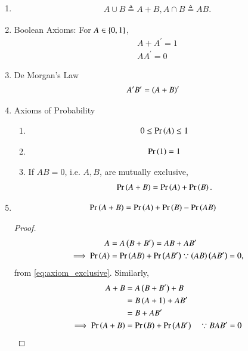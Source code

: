 \begin{enumerate}[label=\thesubsection.\arabic*,ref=\thesubsection.\theenumi]
	\item
\begin{align}
	A \cup B \triangleq A+B, A \cap B \triangleq AB.
\end{align}
	\item  Boolean Axioms:  For $A \in \left\{0,1\right\}$,
\begin{align}
	A + A^{\prime} = 1
	\\
	A  A^{\prime} = 0
\end{align}
\item De Morgan's Law
\begin{align}
A^{\prime}B^{\prime} &=  \brak{A+B}^{\prime}
	\label{eq:demorgan}
\end{align}
\item Axioms of Probability
	\begin{enumerate}
\item 
\begin{align}
	0 \le \pr{A} \le 1	
	\label{eq:axiom-pos}
\end{align}
\item 
\begin{align}
	\pr{1} =1	
	\label{eq:axiom-one}
\end{align}
\item If $AB = 0$, i.e. $A, B$, are mutually exclusive,
\begin{align}
	\pr{A+B} = \pr{A} + \pr{B}.
\label{eq:axiom_exclusive}
\end{align}
	\end{enumerate}
\item 
	\begin{align}
\pr{A+B} &= \pr{A} + \pr{B} - \pr{AB} 
\label{eq:axiom_sum_AB}
\end{align}
		\begin{proof}
\begin{align}
	A &= A \brak{B+B^{\prime}} =  AB + AB^{\prime}
\\
	\implies \pr{A} &=  \pr{AB} + \pr{AB^{\prime}}
	\because
	\brak{ AB}\brak{  AB^{\prime}} = 0,
\label{eq:axiom_sum_A}
\end{align}
from \eqref{eq:axiom_exclusive}.
Similarly,
\begin{align}
A+B &= A\brak{B+B^{\prime}} + B
\\
&= B \brak{A +1} + A B^{\prime}
\\
&=B + A B^{\prime}
\\
	\implies \pr{A+B } 
	&=\pr{B} + \pr{A B^{\prime}}\quad \because B  A B^{\prime} = 0

\end{align}
\end{proof}
\end{enumerate}
